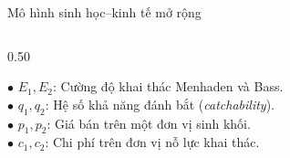 \documentclass[aspectratio=169, 10pt]{beamer}
\begin{document}
\begin{frame}{Mô hình sinh học--kinh tế mở rộng }
\begin{columns}[c]
\begin{column}{0.50\textwidth}
      \begin{tcolorbox}[colback=OceanLight, colframe=OceanNavy, arc=1.5mm, top=1.2mm, bottom=1.2mm, title={\textbf{Ý nghĩa các tham số kinh tế}}]
        \footnotesize
        $\bullet$ $E_1, E_2$: Cường độ khai thác Menhaden và Bass.\\
        $\bullet$ $q_1, q_2$: Hệ số khả năng đánh bắt (\textit{catchability}).\\
        $\bullet$ $p_1, p_2$: Giá bán trên một đơn vị sinh khối.\\
        $\bullet$ $c_1, c_2$: Chi phí trên đơn vị nỗ lực khai thác.
      \end{tcolorbox}
    \end{column}
  \end{columns}
\end{frame}
\end{document}

